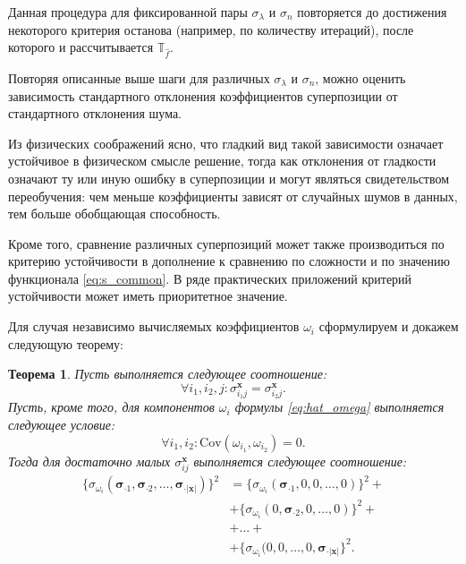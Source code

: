 \documentclass[12pt,a4paper]{article}
\newtheorem{theorem}{Теорема}
\begin{document}
Данная процедура для фиксированной пары $\sigma_{\lambda}$ и $\sigma_n$ повторяется
до достижения некоторого критерия останова (например, по количеству итераций),
после которого и рассчитывается $\mathbb{T}_{\hat{f}}$.

Повторяя описанные выше шаги для различных $\sigma_{\lambda}$ и $\sigma_n$, можно
оценить зависимость стандартного отклонения коэффициентов суперпозиции от
стандартного отклонения шума.

Из физических соображений ясно, что гладкий вид такой зависимости означает устойчивое в
физическом смысле решение, тогда как отклонения от гладкости означают
ту или иную ошибку в суперпозиции и могут являться свидетельством переобучения:
чем меньше коэффициенты зависят от случайных шумов в данных, тем больше обобщающая
способность.

Кроме того, сравнение различных суперпозиций может также производиться по
критерию устойчивости в дополнение к сравнению по сложности и по значению
функционала \eqref{eq:s_common}. В ряде практических приложений критерий устойчивости
может иметь приоритетное значение.

Для случая независимо вычисляемых коэффициентов $\omega_i$ сформулируем и
докажем следующую теорему:
\begin{theorem}
  Пусть выполняется следующее соотношение:
  \[
    \forall i_1, i_2, j: \sigma_{i_1 j}^{\mathbf{x}} = \sigma_{i_2 j}^{\mathbf{x}}.
  \]
  Пусть, кроме того, для компонентов $\omega_i$ формулы \eqref{eq:hat_omega}
  выполняется следующее условие:
  \[
    \forall i_1, i_2: \text{Cov} (\omega_{i_1}, \omega_{i_2}) = 0.
  \]
  Тогда для
  достаточно малых $\sigma_{ij}^\mathbf{x}$ выполняется следующее соотношение:
  \begin{align}
    \{ \sigma_{\omega_i} (\boldsymbol{\sigma}_{\cdot 1}, \boldsymbol{\sigma}_{\cdot 2}, \dots, \boldsymbol{\sigma}_{\cdot |\mathbf{x}|}) \}^2 &=
      \{ \sigma_{\omega_i} (\boldsymbol{\sigma}_{\cdot 1}, 0, 0, \dots, 0) \}^2 + \nonumber \\
      & + \{ \sigma_{\omega_i} (0, \boldsymbol{\sigma}_{\cdot 2}, 0, \dots, 0) \}^2 + \nonumber \\
      & + \dots + \nonumber \\
      & + \{ \sigma_{\omega_i} (0, 0, \dots, 0, \boldsymbol{\sigma}_{\cdot |\mathbf{x}|} \}^2.
    \label{eq:pypha_variance}
  \end{align}
  
  \label{theorem:pypha}
\end{theorem}
\end{document}
